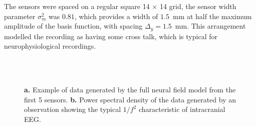 \documentclass[10pt,a4paper]{article}
\begin{document}
The sensors were spaced on a regular square 14 $\times$ 14 grid, the sensor width parameter $\sigma^2_m$ was $0.81$, which provides a width of $1.5$~mm at half the maximum amplitude of the basis function, with spacing $\Delta_y=1.5$~mm. This arrangement modelled the recording as having some cross talk, which is typical for neurophysiological recordings. 
\begin{figure}
   	\begin{center}
    		 \\
   		 \\
   	\end{center}
   	\caption{\textbf{a.} Example of data generated by the full neural field model from the first 5 sensors. \textbf{b.} Power spectral density of the data generated by an observation showing the typical $1/f^2$ characteristic of intracranial EEG.} 
\label{fig:experimental design}
\end{figure}
\end{document}

